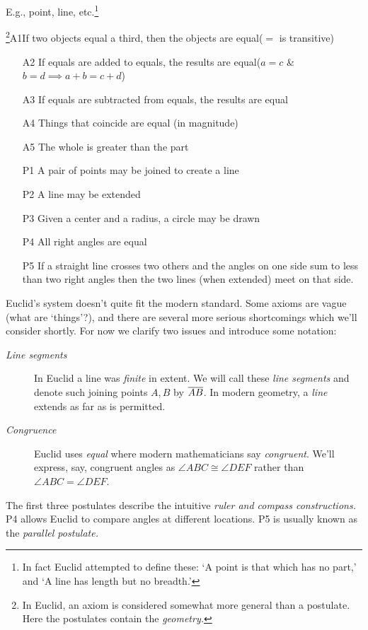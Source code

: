 
\begin{description}\itemsep0pt
	\item[\normalfont\emph{Undefined Terms}] E.g., point, line, etc.\footnote{In fact Euclid attempted to define these: `A point is that which has no part,' and `A line has length but no breadth.'}
	\item[\normalfont\emph{Axioms/Postulates}]\negthickspace\!\footnote{In Euclid, an axiom is considered somewhat more general than a postulate. Here the postulates contain the \emph{geometry.}}\lstsp A1\lstsp If two objects equal a third, then the objects are equal\hfill ($=$ is transitive)\vspace{-5pt}
	\begin{itemize}
		\item[A2] If equals are added to equals, the results are equal\hfill ($a=c$ \& $b=d\implies a+b=c+d$)
		\item[A3] If equals are subtracted from equals, the results are equal
		\item[A4] Things that coincide are equal (in magnitude)
		\item[A5] The whole is greater than the part
		\item[P1] A pair of points may be joined to create a line
		\item[P2] A line may be extended
		\item[P3] Given a center and a radius, a circle may be drawn
		\item[P4] All right angles are equal
		\item[P5] If a straight line crosses two others and the angles on one side sum to less than two right angles then the two lines (when extended) meet on that side.
	\end{itemize}
\end{description}

\goodbreak


Euclid's system doesn't quite fit the modern standard. Some axioms are vague (what are `things'?), and there are several more serious shortcomings which we'll consider shortly. For now we clarify two issues and introduce some notation:
\begin{description}
	\item[\normalfont\emph{Line segments}] In Euclid a line was \emph{finite} in extent. We will call these \emph{line segments} and denote such joining points $A,B$ by $\overline{AB}$. In modern geometry, a \emph{line} extends as far as is permitted.
	\item[\normalfont\emph{Congruence}] Euclid uses \emph{equal} where modern mathematicians say \emph{congruent}. We'll express, say, congruent angles as $\angle ABC\cong\angle DEF$ rather than $\angle ABC=\angle DEF$.
\end{description}
The first three postulates describe the intuitive \emph{ruler and compass constructions.} P4 allows Euclid to compare angles at different locations. P5 is usually known as the \emph{parallel postulate.}


